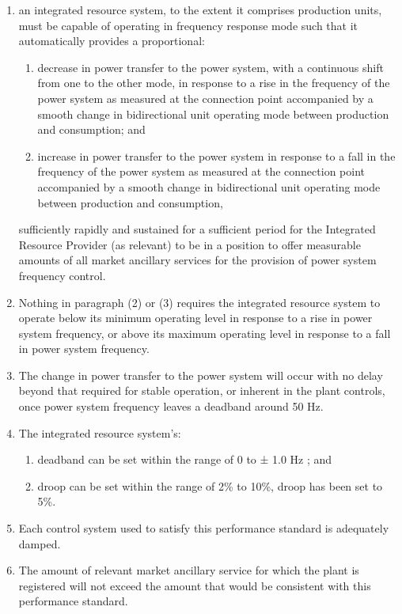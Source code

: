 \begin{enumerate}[label=(\arabic*)]
	\item an integrated resource system, to the extent it comprises production units, must be capable of operating in frequency response mode such that it automatically provides a proportional:
	\begin{enumerate}[label=(\roman*)]
		\item decrease in power transfer to the power system, with a continuous shift from one to the other mode, in response to a rise in the frequency of the power system as measured at the connection point accompanied by a smooth change in bidirectional unit operating mode between production and consumption; and
		\item increase in power transfer to the power system in response to a fall in the frequency of the power system as measured at the connection point accompanied by a smooth change in bidirectional unit operating mode between production and consumption, 
	\end{enumerate}
	sufficiently rapidly and sustained for a sufficient period for the Integrated Resource Provider (as relevant) to be in a position to offer measurable amounts of all market ancillary services for the provision of power system frequency control.
	\item Nothing in paragraph (2) or (3) requires the integrated resource system to operate below its minimum operating level in response to a rise in power system frequency, or above its maximum operating level in response to a fall in power system frequency.  
	\item The change in power transfer to the power system will occur with no delay beyond that required for stable operation, or inherent in the plant controls, once power system frequency leaves a deadband around 50 Hz.
	\item The integrated resource system’s:
	\begin{enumerate}[label=(\roman*)]
		\item deadband can be set within the range of 0 to ± 1.0 Hz ; and
		\item droop can be set within the range of 2\% to 10\%, droop has been set to 5\%.
	\end{enumerate}
	\item Each control system used to satisfy this performance standard is adequately damped.
	\item The amount of relevant market ancillary service for which the plant is registered will not exceed the amount that would be consistent with this performance standard. 
\end{enumerate}
